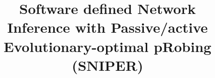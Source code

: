 \documentclass[10pt, conference, letterpaper]{IEEEtran}
\begin{document}
\title{Software defined Network Inference with Passive/active Evolutionary-optimal pRobing (SNIPER)}

%
\maketitle



% 
% 
% 




%





%
%


%
\end{document}
